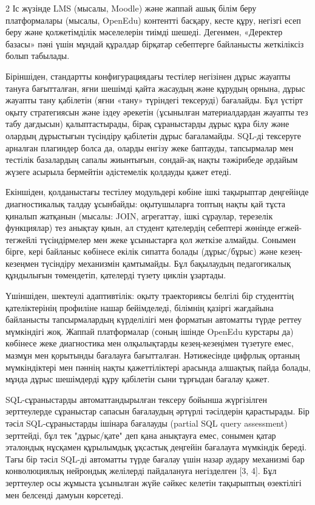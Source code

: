 \begin{multicols}{2}
Іс жүзінде LMS (мысалы, Moodle) және жаппай ашық білім беру
платформалары (мысалы, OpenEdu) контентті басқару, кесте құру, негізгі
есеп беру және қолжетімділік мәселелерін тиімді шешеді. Дегенмен,
«Деректер базасы» пәні үшін мұндай құралдар бірқатар себептерге
байланысты жеткіліксіз болып табылады.

Біріншіден, стандартты конфигурациядағы тестілер негізінен дұрыс жауапты
тануға бағытталған, яғни шешімді қайта жасаудың және құрудың орнына,
дұрыс жауапты тану қабілетін (яғни «тану» түріндегі тексеруді)
бағалайды. Бұл үстірт оқыту стратегиясын және іздеу әрекетін (ұсынылған
материалдардан жауапты тез табу дағдысын) қалыптастырады, бірақ
сұраныстарды дұрыс құра білу және олардың дұрыстығын түсіндіру қабілетін
дұрыс бағаламайды. SQL-ді тексеруге арналған плагиндер болса да, оларды
енгізу жеке баптауды, тапсырмалар мен тестілік базалардың сапалы
жиынтығын, сондай-ақ нақты тәжірибеде әрдайым жүзеге асырыла бермейтін
әдістемелік қолдауды қажет етеді.

Екіншіден, қолданыстағы тестілеу модульдері көбіне ішкі тақырыптар
деңгейінде диагностикалық талдау ұсынбайды: оқытушыларға топтың нақты
қай тұста қиналып жатқанын (мысалы: JOIN, агрегаттау, ішкі сұраулар,
терезелік функциялар) тез анықтау қиын, ал студент қателердің себептері
жөнінде егжей-тегжейлі түсіндірмелер мен жеке ұсыныстарға қол жеткізе
алмайды. Сонымен бірге, кері байланыс көбінесе екілік сипатта болады
(дұрыс/бұрыс) және кезең-кезеңмен түсіндіру механизмін қамтымайды. Бұл
бақылаудың педагогикалық құндылығын төмендетіп, қателерді түзету циклін
ұзартады.

Үшіншіден, шектеулі адаптивтілік: оқыту траекториясы белгілі бір
студенттің қателіктерінің профиліне нашар бейімделеді, білімнің қазіргі
жағдайына байланысты тапсырмалардың күрделілігі мен форматын автоматты
түрде реттеу мүмкіндігі жоқ. Жаппай платформалар (соның ішінде OpenEdu
курстары да) көбінесе жеке диагностика мен олқылықтарды кезең-кезеңімен
түзетуге емес, мазмұн мен қорытынды бағалауға бағытталған. Нәтижесінде
цифрлық ортаның мүмкіндіктері мен пәннің нақты қажеттіліктері арасында
алшақтық пайда болады, мұнда дұрыс шешімдерді құру қабілетін сыни
тұрғыдан бағалау қажет.

SQL-сұраныстарды автоматтандырылған тексеру бойынша жүргізілген
зерттеулерде сұраныстар сапасын бағалаудың әртүрлі тәсілдерін
қарастырады. Бір тәсіл SQL‑сұраныстарды ішінара бағалауды (partial SQL
query assessment) зерттейді, бұл тек "дұрыс/қате" деп қана анықтауға
емес, сонымен қатар эталондық нұсқамен құрылымдық ұқсастық деңгейін
бағалауға мүмкіндік береді. Тағы бір тәсіл SQL-ді автоматты түрде
бағалау үшін назар аудару механизмі бар конволюциялық нейрондық
желілерді пайдалануға негізделген {[}3, 4{]}. Бұл зерттеулер осы жұмыста
ұсынылған жүйе сәйкес келетін тақырыптың өзектілігі мен белсенді дамуын
көрсетеді.


\end{multicols}
